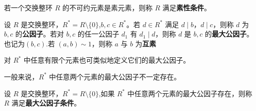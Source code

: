 \documentclass[../../main.tex]{subfiles}%
\begin{document}
\begin{definition}
若一个交换整环 \( R \) 的不可约元素是素元素，则称 \( R \) 满足\textbf{素性条件}。
\end{definition}

\begin{definition}
设 \( R \) 是交换整环，\( R^* = R \setminus \{0\} \),\( b, c \in R^* \)。若 \( d \in R^* \) 满足 \( d \mid b \)，\( d \mid c \)，则称 \( d \) 为 \( b, c \) 的\textbf{公因子}。若对 \( b, c \) 的任一公因子 \( d_1 \) 有 \( d_1 \mid d \)，则称 \( d \) 是 \( b, c \) 的\textbf{最大公因子}。也记为$(b,c)$.若 \( (a, b) \sim 1 \)，则称 \( a \) 与 \( b \) 为\textbf{互素}

对 \( R^* \) 中任意有限个元素也可类似地定义它们的最大公因子。
\end{definition}
\begin{remark}
一般来说，\( R^* \) 中任意两个元素的最大公因子不一定存在。
\end{remark}

\begin{definition}
设 \( R \) 是交换整环，\( R^* = R \setminus \{0\} \),如果 \( R^* \) 中任意两个元素的最大公因子存在，则称 \( R \) 满足\textbf{最大公因子条件}。
\end{definition}
\end{document}
